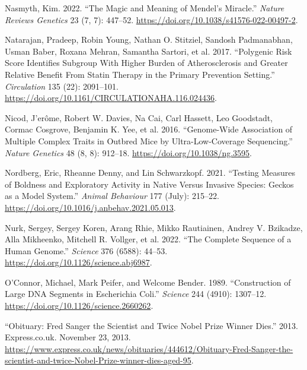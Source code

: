 \documentclass[
]{book}
\newlength{\cslhangindent}
\newlength{\cslentryspacingunit} %
\newenvironment{CSLReferences}[2] %
 {%
  \setlength{\parindent}{0pt}
  \ifodd #1
  \let\oldpar\par
  \def\par{\hangindent=\cslhangindent\oldpar}
  \fi
  \setlength{\parskip}{#2\cslentryspacingunit}
 }%
 {}
\begin{document}
\begin{CSLReferences}{1}{0}
\leavevmode{}%
Nasmyth, Kim. 2022. {``The Magic and Meaning of {Mendel}'s Miracle.''} \emph{Nature Reviews Genetics} 23 (7, 7): 447--52. \url{https://doi.org/10.1038/s41576-022-00497-2}.

\leavevmode{}%
Natarajan, Pradeep, Robin Young, Nathan O. Stitziel, Sandosh Padmanabhan, Usman Baber, Roxana Mehran, Samantha Sartori, et al. 2017. {``Polygenic {Risk Score Identifies Subgroup With Higher Burden} of {Atherosclerosis} and {Greater Relative Benefit From Statin Therapy} in the {Primary Prevention Setting}.''} \emph{Circulation} 135 (22): 2091--101. \url{https://doi.org/10.1161/CIRCULATIONAHA.116.024436}.

\leavevmode{}%
Nicod, J'erôme, Robert W. Davies, Na Cai, Carl Hassett, Leo Goodstadt, Cormac Cosgrove, Benjamin K. Yee, et al. 2016. {``Genome-Wide Association of Multiple Complex Traits in Outbred Mice by Ultra-Low-Coverage Sequencing.''} \emph{Nature Genetics} 48 (8, 8): 912--18. \url{https://doi.org/10.1038/ng.3595}.

\leavevmode{}%
Nordberg, Eric, Rheanne Denny, and Lin Schwarzkopf. 2021. {``Testing Measures of Boldness and Exploratory Activity in Native Versus Invasive Species: Geckos as a Model System.''} \emph{Animal Behaviour} 177 (July): 215--22. \url{https://doi.org/10.1016/j.anbehav.2021.05.013}.

\leavevmode{}%
Nurk, Sergey, Sergey Koren, Arang Rhie, Mikko Rautiainen, Andrey V. Bzikadze, Alla Mikheenko, Mitchell R. Vollger, et al. 2022. {``The Complete Sequence of a Human Genome.''} \emph{Science} 376 (6588): 44--53. \url{https://doi.org/10.1126/science.abj6987}.

\leavevmode{}%
O'Connor, Michael, Mark Peifer, and Welcome Bender. 1989. {``Construction of {Large DNA Segments} in {Escherichia} Coli.''} \emph{Science} 244 (4910): 1307--12. \url{https://doi.org/10.1126/science.2660262}.

\leavevmode{}%
{``Obituary: {Fred Sanger} the Scientist and Twice {Nobel Prize} Winner Dies.''} 2013. {Express.co.uk}. November 23, 2013. \url{https://www.express.co.uk/news/obituaries/444612/Obituary-Fred-Sanger-the-scientist-and-twice-Nobel-Prize-winner-dies-aged-95}.


\end{CSLReferences}
\end{document}
